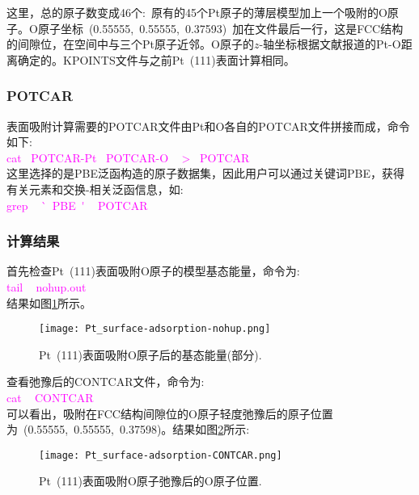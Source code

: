 这里，总的原子数变成46个:~原有的45个\textrm{Pt}原子的薄层模型加上一个吸附的\textrm{O}原子。\textrm{O}原子坐标~(0.55555,~0.55555,~0.37593)~加在文件最后一行，这是\textrm{FCC}结构的间隙位，在空间中与三个\textrm{Pt}原子近邻。\textrm{O}原子的$z$-轴坐标根据文献报道的\textrm{Pt-O}距离确定的。\textrm{KPOINTS}文件与之前\textrm{Pt~(111)}表面计算相同。
\subsubsection{\rm{POTCAR}}
表面吸附计算需要的\textrm{POTCAR}文件由\textrm{Pt}和\textrm{O}各自的\textrm{POTCAR}文件拼接而成，命令如下:~\\
\textcolor{magenta}{\textrm{cat~ POTCAR-Pt~ POTCAR-O ~ > ~POTCAR}}\\
这里选择的是\textrm{PBE}泛函构造的原子数据集，因此用户可以通过关键词\textrm{PBE}，获得有关元素和交换-相关泛函信息，如:~\\
\textcolor{magenta}{\textrm{grep ~ \`~PBE~\' ~ POTCAR}}\\
\subsubsection{\rm{计算结果}}
首先检查\textrm{Pt~(111)}表面吸附\textrm{O}原子的模型基态能量，命令为:\\
\textcolor{magenta}{\textcolor{magenta}{\textrm{tail ~ nohup.out}}}\\
结果如图\ref{Pt_surface-adsorption-nohup}所示。
\begin{figure}[h!]
\centering
\vskip -10pt
\texttt{[image: Pt\_surface-adsorption-nohup.png]}
\caption{\small \textrm{\textrm{Pt~(111)}表面吸附\textrm{O}原子后的基态能量(部分).}}%
\label{Pt_surface-adsorption-nohup}
\end{figure}

查看弛豫后的\textrm{CONTCAR}文件，命令为:~\\
\textcolor{magenta}{\textrm{cat ~ CONTCAR}}\\
可以看出，吸附在\textrm{FCC}结构间隙位的\textrm{O}原子轻度弛豫后的原子位置为~(0.55555,~0.55555,~0.37598)。结果如图\ref{Pt_surface-adsorption-CONTCAR}所示:~
\begin{figure}[h!]
\centering
\vskip -10pt
\texttt{[image: Pt\_surface-adsorption-CONTCAR.png]}
\caption{\small \textrm{\textrm{Pt~(111)}表面吸附\textrm{O}原子弛豫后的\textrm{O}原子位置.}}%
\label{Pt_surface-adsorption-CONTCAR}
\end{figure}

